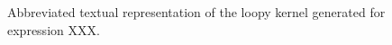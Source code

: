 \documentclass[thesis]{subfiles}
\begin{document}

\begin{figure}
  \centering
  \begin{minipage}{.8\textwidth}
    \inputminted{text}{./scripts/artefacts/codegen_example_loopy_kernel_tidy.txt}
  \end{minipage}
  \caption{
    Abbreviated textual representation of the loopy kernel generated for expression XXX.
  }
  \label{lst:codegen_example_loopy_kernel}
\end{figure}
\end{document}
